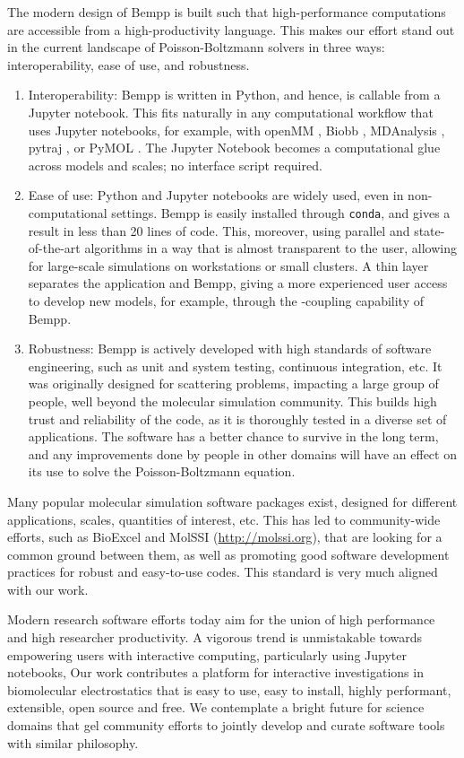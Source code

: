 The modern design of Bempp is built such that high-performance computations are accessible from a high-productivity language.
This makes our effort stand out in the current landscape of Poisson-Boltzmann solvers in three ways: interoperability, ease of use, and robustness. 
\begin{enumerate}
\item Interoperability: Bempp is written in Python, and hence, is callable from a Jupyter notebook. This fits naturally in any computational workflow that uses Jupyter notebooks, for example, with openMM \cite{EastmanETal2017}, Biobb \cite{AndrioETal2019}, MDAnalysis \cite{GowersETal2019}, pytraj \cite{RoeCheatham2013}, or PyMOL \cite{PyMOL}. The Jupyter Notebook becomes a computational glue across models and scales; no interface script required. 

\item Ease of use: Python and Jupyter notebooks are widely used, even in non-computational settings. Bempp is easily installed through \texttt{conda}, and gives a result in less than 20 lines of code. This, moreover, using parallel and state-of-the-art algorithms in a way that is almost transparent to the user, allowing for large-scale simulations on workstations or small clusters.
A thin layer separates the application and Bempp, giving a more experienced user access to develop new models, for example, through the \fmm-\bem coupling capability of Bempp.

\item Robustness: Bempp is actively developed with high standards of software engineering, such as unit and system testing, continuous integration, etc. It was originally designed for scattering problems, impacting a large group of people, well beyond the molecular simulation community. This builds high trust and reliability of the code, as it is thoroughly tested in a diverse set of applications. The software has a better chance to survive in the long term, and any improvements done by people in other domains will have an effect on its use to solve the Poisson-Boltzmann equation. 

\end{enumerate}

Many popular molecular simulation software packages exist, designed for different applications, scales, quantities of interest, etc.
This has led to community-wide efforts, such as BioExcel and MolSSI (\url{http://molssi.org}), that are looking for a common ground between them, as well as promoting good software development practices for robust and easy-to-use codes.
This standard is very much aligned with our work.

Modern research software efforts today aim for the union of high performance and high researcher productivity.
A vigorous trend is unmistakable towards empowering users with interactive computing, particularly using Jupyter notebooks, 
Our work contributes a platform for interactive investigations in biomolecular electrostatics that is easy to use, easy to install, highly performant, extensible, open source and free.
We contemplate a bright future for science domains that gel community efforts to jointly develop and curate software tools with similar philosophy.